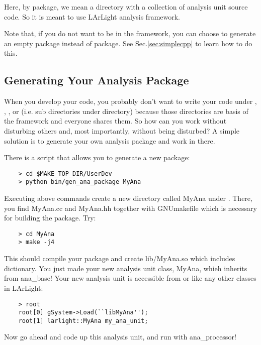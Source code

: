 
Here, by \Analysis package, we mean a directory with a collection of analysis unit source code. So it is meant to use LArLight analysis framework. 

Note that, if you do not want to be in the \Analysis framework, you can choose to generate an empty \CPP package instead of \Analysis package. See Sec.\ref{sec:simplecpp} to learn how to do this.

\subsection{Generating Your Analysis Package}
When you develop your code, you probably don't want to write your code under \Base, \DataFormat, \LArUtil, or \Analysis (i.e. sub directories under \Core directory) because those directories are basis of the framework and everyone shares them. So how can you work without disturbing others and, most importantly, without being disturbed? A simple solution is to generate your own analysis package and work in there. 

There is a \python script that allows you to generate a new package:
\begin{lstlisting}
    > cd $MAKE_TOP_DIR/UserDev
    > python bin/gen_ana_package MyAna
\end{lstlisting}
Executing above commands create a new directory called MyAna under \UserDev. There, you find {\ttfamily MyAna.cc} and {\ttfamily MyAna.hh} together with {\ttfamily GNUmakefile} which is necessary for building the package. Try:
\begin{lstlisting}
    > cd MyAna
    > make -j4
\end{lstlisting}
This should compile your package and create {\ttfamily lib/MyAna.so} which includes \CINT dictionary. You just made your new analysis unit class, {\ttfamily MyAna}, whieh inherits from {\ttfamily ana\_base}! Your new analysis unit is accessible from \CINT or \PyROOT like any other classes in LArLight:
\begin{lstlisting}
    > root
    root[0] gSystem->Load(``libMyAna'');
    root[1] larlight::MyAna my_ana_unit;
\end{lstlisting}
Now go ahead and code up this analysis unit, and run with {\ttfamily ana\_processor}!

